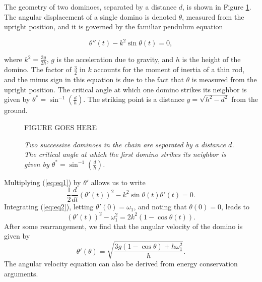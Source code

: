%
%
%
%
%
The geometry of two dominoes, separated by a distance $d$, is
shown in Figure \ref{fig:geometry}. The angular displacement of a
single domino is denoted $\theta$, measured from the upright
position, and it is governed by the familiar pendulum equation

\begin{equation} \label{eq:eq1}
\theta''(t) - k^2 \sin \theta(t)=0,
\end{equation}

where $k^2=\frac{3g}{2h}$, $g$ is the acceleration due to gravity,
and $h$ is the height of the domino. The factor of $\frac 32$ in
$k$ accounts for the moment of inertia of a thin rod, and the
minus sign in this equation is due to the fact that $\theta$ is
measured from the upright position. The critical angle at which
one domino strikes its neighbor is given by $\theta^\ast =
\sin^{-1} (\frac{d}{h})$. The striking point is a distance
$y=\sqrt{h^2-d^2}$ from the ground.\cite{golub}

\begin{figure}[ht]
\begin{center}
\vspace{0.5in}

{\sc FIGURE GOES HERE}

\vspace{0.5in}

\end{center}
\caption{\label{fig:geometry}{\em Two successive dominoes in the
chain are separated by a distance $d$. The critical angle at which
the first domino strikes its neighbor is given by $\theta^\ast =
\sin^{-1} (\frac{d}{h})$.}}
\end{figure}

Multiplying (\ref{eq:eq1}) by $\theta'$ allows us to write
\begin{equation} \label{eq:eq2}
\frac 12 \frac{d}{dt}(\theta'(t))^2 - k^2 \sin
\theta(t)\theta'(t)=0.
\end{equation}
Integrating (\ref{eq:eq2}), letting $\theta'(0)=\omega_1$, and
noting that $\theta(0)=0$, leads to
\[
(\theta'(t))^2-\omega_1^2 = 2k^2(1-\cos \theta(t)) .
\]
After some rearrangement, we find that the angular velocity of the
domino is given by\cite{brandtmoc}
\begin{equation} \label{eq:eq3}
\theta'(\theta)=\sqrt{\frac{3g(1-\cos \theta) + h \omega_1^2}{h}}.
\end{equation}
The angular velocity equation can also be derived from energy
conservation arguments.

